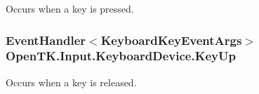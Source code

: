 Occurs when a key is pressed. 

\hypertarget{class_open_t_k_1_1_input_1_1_keyboard_device_a43137321dca3a4056c8475d483714744}{
\subsubsection[{Key\-Up}]{\setlength{\rightskip}{0pt plus 5cm}Event\-Handler$<${\bf Keyboard\-Key\-Event\-Args}$>$ Open\-T\-K.\-Input.\-Keyboard\-Device.\-Key\-Up}}\label{class_open_t_k_1_1_input_1_1_keyboard_device_a43137321dca3a4056c8475d483714744}


Occurs when a key is released. 

